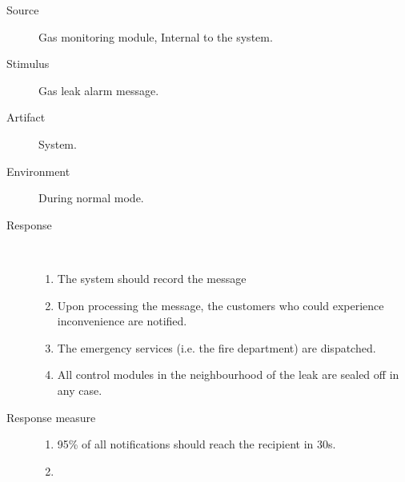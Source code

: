 \begin{description}
	\item[Source] Gas monitoring module, Internal to the system.
	\item[Stimulus] Gas leak alarm message.
	\item[Artifact] System.
	\item[Environment] During normal mode.
	\item[Response] \
		\begin{enumerate}
		  \item The system should record the message
		  \item Upon processing the message, the customers who could experience
		  inconvenience are notified.
		  \item The emergency services (i.e. the fire department) are dispatched.
		  \item All control modules in the neighbourhood of the leak are sealed off in
		  any case.
		\end{enumerate}
	\item[Response measure] 
	\begin{enumerate}
	  \item 95\% of all notifications should reach the recipient in 30s. 
	  \item %
	\end{enumerate}
\end{description}